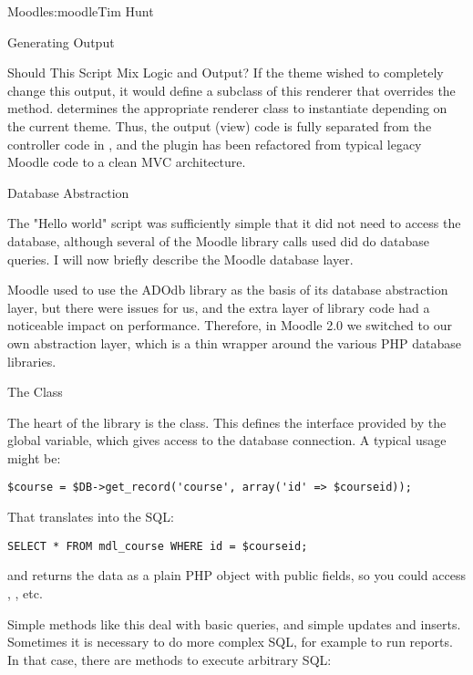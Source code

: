 \begin{aosachapter}{Moodle}{s:moodle}{Tim Hunt}
\begin{aosasect1}{Generating Output}
\begin{aosasect2}{Should This Script Mix Logic and Output?}
If the theme wished to completely change this output, it would define
a subclass of this renderer that overrides the 
method.  determines the
appropriate renderer class to instantiate depending on the current
theme. Thus, the output (view) code is fully separated from the
controller code in , and the plugin has been refactored
from typical legacy Moodle code to a clean MVC architecture.

\end{aosasect2}

\end{aosasect1}

\begin{aosasect1}{Database Abstraction}

The "Hello world" script was sufficiently simple that it did not need to
access the database, although several of the Moodle library calls used
did do database queries. I will now briefly describe the Moodle
database layer.

Moodle used to use the ADOdb library as the basis of its database
abstraction layer, but there were issues for us, and the extra layer
of library code had a noticeable impact on performance. Therefore, in Moodle
2.0 we switched to our own abstraction layer, which is a thin wrapper
around the various PHP database libraries.

\begin{aosasect2}{The  Class}

The heart of the library is the  class. This
defines the interface provided by the  global variable,
which gives access to the database connection. A typical usage might
be:

\begin{verbatim}
$course = $DB->get_record('course', array('id' => $courseid));
\end{verbatim}

\noindent That translates into the SQL:

\begin{verbatim}
SELECT * FROM mdl_course WHERE id = $courseid;
\end{verbatim}

\noindent and returns the data as a plain PHP object with public fields, so you
could access ,
, etc.

Simple methods like this deal with basic queries, and simple updates
and inserts. Sometimes it is necessary to do more complex SQL, for
example to run reports. In that case, there are methods to execute
arbitrary SQL:


\end{aosasect2}
\end{aosasect1}
\end{aosachapter}
